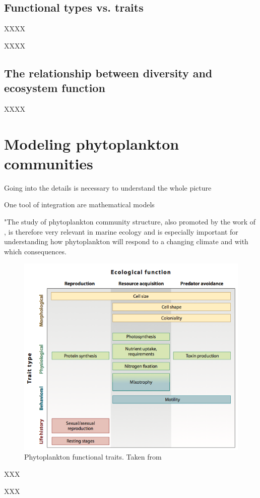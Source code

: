 \subsection{Functional types vs. traits}

XXXX


XXXX

\subsection{The relationship between diversity and ecosystem function}

XXXX


\section{Modeling phytoplankton communities}
Going into the details is necessary to understand the whole picture

One tool of integration are mathematical models

"The study of phytoplankton community structure, also promoted by the work of \citet{Falkowski1998}, is therefore very relevant in marine ecology and is especially important for understanding how phytoplankton will respond to a changing climate and with which consequences.



\begin{figure}
\centering
\includegraphics[width=0.7\linewidth]{./Chp1-Intro/Fig_litchman2008.png}
\caption[Scheme]{\small{Phytoplankton functional traits. Taken from \citet{Litchman2008}}}
\label{phytotrait}
\end{figure}

XXX

XXX


